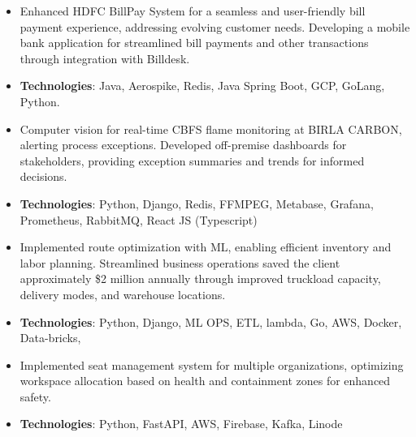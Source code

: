 
  

\begin{itemize}
\item Enhanced HDFC BillPay System for a seamless and user-friendly bill payment experience, addressing evolving customer needs. Developing a mobile bank application for streamlined bill payments and other transactions through integration with Billdesk.
\item \textbf{Technologies}: Java, Aerospike, Redis, Java Spring Boot, GCP, GoLang, Python.\\
\end{itemize}
\smallskip
\smallskip

\begin{itemize}
\item Computer vision for real-time CBFS flame monitoring at BIRLA CARBON, alerting process exceptions. Developed off-premise dashboards for stakeholders, providing exception summaries and trends for informed decisions.
\item \textbf{Technologies}: Python, Django, Redis, FFMPEG, Metabase, Grafana, Prometheus, Rabbit\hspace{2mm}MQ, React JS (Typescript)\\
\end{itemize}
\smallskip
\smallskip

\begin{itemize}
\item Implemented route optimization with ML, enabling efficient inventory and labor planning. Streamlined business operations saved the client approximately \$2 million annually through improved truckload capacity, delivery modes, and warehouse locations.
\item \textbf{Technologies}: Python, Django, ML OPS, ETL, lambda, Go, AWS, Docker, Data-bricks,  \\
\end{itemize}
\smallskip
\smallskip

\begin{itemize}
\item Implemented seat management system for multiple organizations, optimizing workspace allocation based on health and containment zones for enhanced safety.
\item \textbf{Technologies}: Python, FastAPI, AWS, Firebase, Kafka, Linode\
\end{itemize}
\smallskip

